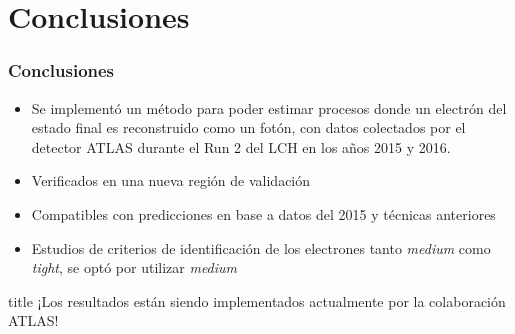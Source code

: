 \documentclass[10pt, compress,spanish]{beamer}
\begin{document}
\section{Conclusiones}
\begin{frame}[fragile]
\frametitle{Conclusiones}

\normalsize

\begin{itemize}

\item Se implementó un método para poder estimar procesos donde un electrón del estado final es reconstruido como un fotón, con datos colectados por el detector ATLAS durante el Run 2 del LCH en los años 2015 y 2016.

\item Verificados en una nueva región de validación

\item Compatibles con predicciones en base a datos del 2015 y técnicas anteriores

\item Estudios de criterios de identificación de los electrones tanto \textit{medium} como \textit{tight}, se optó por utilizar \textit{medium}

\end{itemize}


\vspace{1cm}


\begin{beamercolorbox}[leftskip=\titlelf]{title}
\centering{}\large ¡Los resultados están siendo implementados actualmente por la colaboración ATLAS!
\end{beamercolorbox}


\end{frame}



\end{document}

